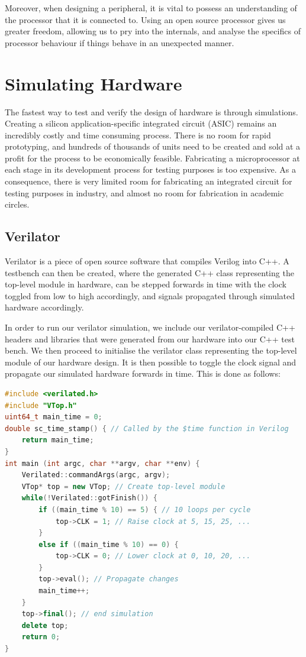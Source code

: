 \documentclass[a4paper,8pt]{report}
\begin{document}
Moreover, when designing a peripheral, it is vital to possess an understanding
of the processor that it is connected to. Using an open source processor gives
us greater freedom, allowing us to pry into the internals, and analyse the
specifics of processor behaviour if things behave in an unexpected manner.

\section{Simulating Hardware} 
The fastest way to test and verify the design of hardware is through simulations.
Creating a silicon application-specific integrated circuit (ASIC) remains an
incredibly costly and time consuming process.
There is no room for rapid prototyping, and hundreds of thousands of units need
to be created and sold at a profit for the process to be economically
feasible. Fabricating a microprocessor at each stage in its development process
for testing purposes is too expensive. As a consequence, there is very
limited room for fabricating an integrated circuit for testing purposes in
industry, and almost no room for fabrication in academic circles.

\subsection{Verilator}
Verilator is a piece of open source software that compiles Verilog into C++. A
testbench can then be created, where the generated C++ class representing the
top-level module in hardware, can be stepped forwards in time with the clock
toggled from low to high accordingly, and signals propagated through simulated
hardware accordingly.

In order to run our verilator simulation, we include our verilator-compiled C++
headers and libraries that were generated from our hardware into our C++ test
bench. We then proceed to initialise the verilator class representing the
top-level module of our hardware design. It is then possible to toggle the clock
signal and propagate our simulated hardware forwards in time. This is done as
follows:
\begin{lstlisting}[language=C++,style=customcpp]
#include <verilated.h>
#include "VTop.h"
uint64_t main_time = 0;
double sc_time_stamp() { // Called by the $time function in Verilog
    return main_time;
}
int main (int argc, char **argv, char **env) {
    Verilated::commandArgs(argc, argv);
    VTop* top = new VTop; // Create top-level module
    while(!Verilated::gotFinish()) {
        if ((main_time % 10) == 5) { // 10 loops per cycle
            top->CLK = 1; // Raise clock at 5, 15, 25, ...
        }
        else if ((main_time % 10) == 0) {
            top->CLK = 0; // Lower clock at 0, 10, 20, ...
        }
        top->eval(); // Propagate changes
        main_time++;
    }
    top->final(); // end simulation
    delete top;
    return 0;
}

\end{lstlisting}
\end{document}
